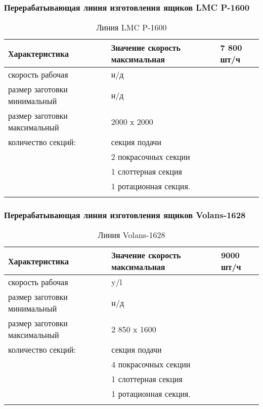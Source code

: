 \subsubsection{Перерабатывающая линия изготовления ящиков LMC P-1600}
\begin{longtable}{|p{10cm}|p{5cm}|}
    \hline
	\textbf{Характеристика} & \textbf{Значение}
	\endhead
 	\hline
 скорость максимальная       	 &  7 800 шт/ч\\
  	\hline 
скорость рабочая                         	& н/д\\
  	\hline 
размер заготовки минимальный  	& н/д   \\	
  	\hline 
  	размер заготовки максимальный   & 2000 x 2000  \\
  	\hline 
количество секций:    	& секция подачи\\
& 2 покрасочных секции \\
& 1 слоттерная секция\\
& 1 ротационная секция.\\
\hline 
  \caption{Линия LMC P-1600}\label{tab:line3}
\end{longtable}

\subsubsection{Перерабатывающая линия изготовления ящиков Volans-1628}
\begin{longtable}{|p{10cm}|p{5cm}|}
    \hline
	\textbf{Характеристика} & \textbf{Значение}
	\endhead
 	\hline
 скорость максимальная       	 & 9000 шт/ч\\
  	\hline 
скорость рабочая                         	& y/l\\
  	\hline 
размер заготовки минимальный  	& н/д   \\	
  	\hline 
  	размер заготовки максимальный   & 2 850 x 1600  \\
  	\hline 
количество секций:    	& секция подачи\\
& 4 покрасочных секции \\
& 1 слоттерная секция\\
& 1 ротационная секция.\\
\hline 
  \caption{Линия Volans-1628}\label{tab:line4}
\end{longtable}


